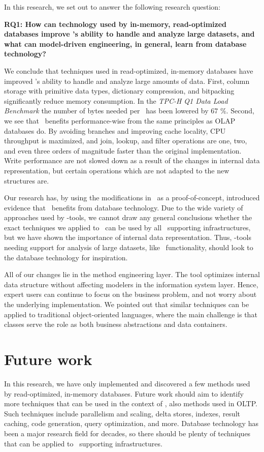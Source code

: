 In this research, we set out to answer the following research question:

\setlength{\leftskip}{1cm}

\textbf{RQ1: How can technology used by in-memory, read-optimized databases improve \gap's ability to handle and analyze large datasets, and what can model-driven engineering, in general, learn from database technology?}

\setlength{\leftskip}{0pt}

We conclude that techniques used in read-optimized, in-memory databases have improved \gap's ability to handle and analyze large amounts of data. First, column storage with primitive data types, dictionary compression, and bitpacking significantly reduce memory consumption. In the \textit{TPC-H Q1 Data Load Benchmark} the number of bytes needed per \lineitem~has been lowered by 67 \%. Second, we see that \gap~benefits performance-wise from the same principles as OLAP databases do. By avoiding branches and improving cache locality, CPU throughput is maximized, and join, lookup, and filter operations are one, two, and even three orders of magnitude faster than the original implementation. Write performance are not slowed down as a result of the changes in internal data representation, but certain operations which are not adapted to the new structures are.

Our research has, by using the modifications in \gap~as a proof-of-concept, introduced evidence that \mde~benefits from database technology. Due to the wide variety of approaches used by \mdd-tools, we cannot draw any general conclusions whether the exact techniques we applied to \gap~can be used by all \mde~supporting infrastructures, but we have shown the importance of internal data representation. Thus, \mde-tools needing support for analysis of large datasets, like \bd~functionality, should look to the database technology for inspiration. 

All of our changes lie in the method engineering layer. The tool optimizes internal data structure without affecting modelers in the information system layer. Hence, expert users can continue to focus on the business problem, and not worry about the underlying implementation. We pointed out that similar techniques can be applied to traditional object-oriented languages, where the main challenge is that classes serve the role as both business abstractions and data containers.

\section{Future work}
\label{sec:Future work}
In this research, we have only implemented and discovered a few methods used by read-optimized, in-memory databases. Future work should aim to identify more techniques that can be used in the context of \mde, also methods used in OLTP. Such techniques include parallelism and scaling, delta stores, indexes, result caching, code generation, query optimization, and more. Database technology has been a major research field for decades, so there should be plenty of techniques that can be applied to \mdd~supporting infrastructures.

